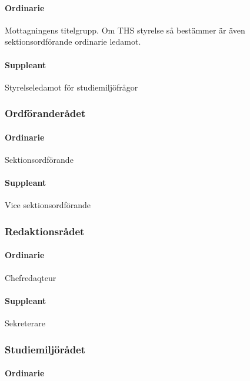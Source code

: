 \documentclass{dgovdoc}
\begin{document}
\paragraph{Ordinarie}

Mottagningens titelgrupp. Om THS styrelse så bestämmer är även
sektionsordförande ordinarie ledamot.

\paragraph{Suppleant}

Styrelseledamot för studiemiljöfrågor

\subsubsection{Ordföranderådet}

\paragraph{Ordinarie}

Sektionsordförande

\paragraph{Suppleant}

Vice sektionsordförande

\subsubsection{Redaktionsrådet}

\paragraph{Ordinarie}

Chefredaqteur

\paragraph{Suppleant}

Sekreterare

\subsubsection{Studiemiljörådet}

\paragraph{Ordinarie}
\end{document}
